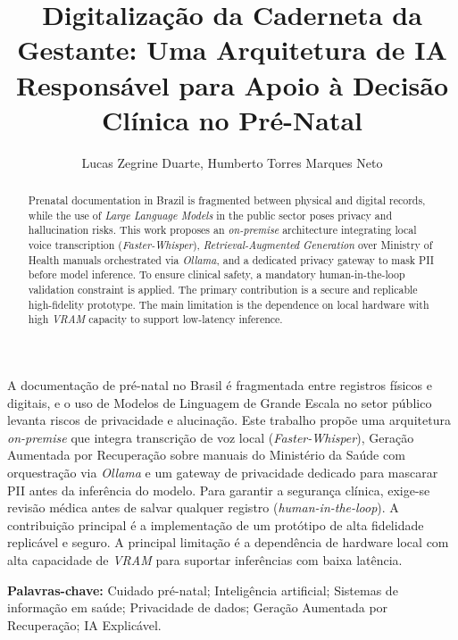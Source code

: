 \documentclass[12pt]{article}
\title{Digitalização da Caderneta da Gestante: Uma Arquitetura de IA Responsável para Apoio à Decisão Clínica no Pré-Natal}
\author{Lucas Zegrine Duarte\inst{1}, Humberto Torres Marques Neto\inst{1}}
\begin{document}
\maketitle

\begin{abstract}
  Prenatal documentation in Brazil is fragmented between physical and digital records, while the use of \textit{Large Language Models} in the public sector poses privacy and hallucination risks.
  This work proposes an \textit{on-premise} architecture integrating local voice transcription (\textit{Faster-Whisper}), \textit{Retrieval-Augmented Generation} over Ministry of Health manuals orchestrated via \textit{Ollama}, and a dedicated privacy gateway to mask PII before model inference.
  To ensure clinical safety, a mandatory human-in-the-loop validation constraint is applied. The primary contribution is a secure and replicable high-fidelity prototype.
  The main limitation is the dependence on local hardware with high \textit{VRAM} capacity to support low-latency inference.
\end{abstract}

\begin{resumo}
  A documentação de pré-natal no Brasil é fragmentada entre registros físicos e digitais, e o uso de Modelos de Linguagem de Grande Escala no setor público levanta riscos de privacidade e alucinação.
  Este trabalho propõe uma arquitetura \textit{on-premise} que integra transcrição de voz local (\textit{Faster-Whisper}), Geração Aumentada por Recuperação sobre manuais do Ministério da Saúde com orquestração via \textit{Ollama} e um gateway de privacidade dedicado para mascarar PII antes da inferência do modelo.
  Para garantir a segurança clínica, exige-se revisão médica antes de salvar qualquer registro (\textit{human-in-the-loop}). A contribuição principal é a implementação de um protótipo de alta fidelidade replicável e seguro.
  A principal limitação é a dependência de hardware local com alta capacidade de \textit{VRAM} para suportar inferências com baixa latência.
\end{resumo}

\noindent \textbf{Palavras-chave:} Cuidado pré-natal; Inteligência artificial; Sistemas de informação em saúde; Privacidade de dados; Geração Aumentada por Recuperação; IA Explicável.

\end{document}
